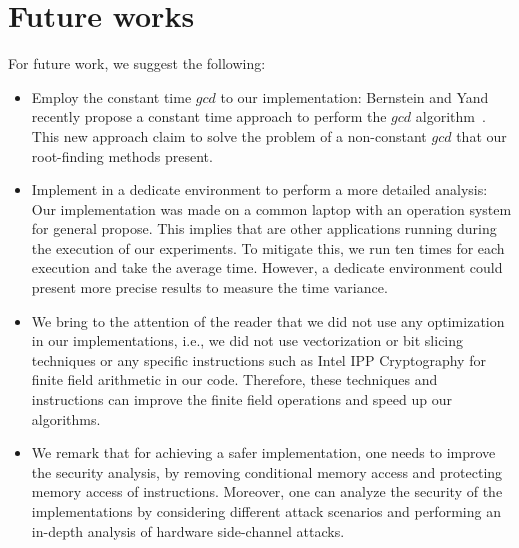 \section{Future works}
For future work, we suggest the following:

\begin{itemize}
    \item Employ the constant time $gcd$ to our implementation: Bernstein and Yand recently propose a constant time approach to perform the $gcd$ algorithm~\cite{Bernstein_Yang_2019}. This new approach claim to solve the problem of a non-constant $gcd$ that our root-finding methods present. 
    \item Implement in a dedicate environment to perform a more detailed analysis: Our implementation was made on a common laptop with an operation system for general propose. This implies that are other applications running during the execution of our experiments. To mitigate this, we run ten times for each execution and take the average time. However, a dedicate environment could present more precise results to measure the time variance. 
    \item We bring to the attention of the reader that we did not use any optimization in our implementations, i.e., we did not use vectorization or bit slicing techniques or any specific instructions such as Intel\textsuperscript{\tiny\textregistered} IPP Cryptography for finite field arithmetic in our code. Therefore, these techniques and instructions can improve the finite field operations and speed up our algorithms.
    \item We remark that for achieving a safer implementation, one needs to improve the security analysis, by removing conditional memory access and protecting memory access of instructions. Moreover, one can analyze the security of the implementations by considering different attack scenarios and performing an in-depth analysis of hardware side-channel attacks. 
\end{itemize}